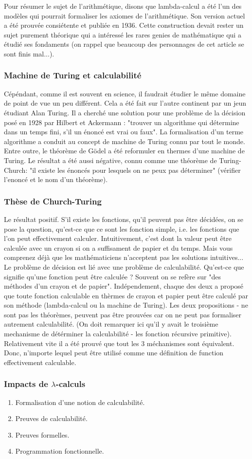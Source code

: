 \documentclass[12pt, a4paper]{article}
\begin{document}
Pour résumer le sujet de l'arithmétique, disons que lambda-calcul a été l'un des modèles qui pourrait formaliser les axiomes de l'arithmétique. Son version actuel a été prouvée consiétente et publiée en 1936. Cette construction devait rester un sujet purement théorique qui a intéressé les rares genies de mathématique qui a étudié ses fondaments (on rappel que beaucoup des personnages de cet article se sont finis mal...). 

\subsubsection*{Machine de Turing et calculabilité}
Cépéndant, comme il est souvent en science, il faudrait étudier le même domaine de point de vue un peu différent. Cela a été fait sur l'autre continent par un jeun étudiant Alan Turing. Il a cherché une solution pour une problème de la décision posé en 1928 par Hilbert et Ackermann : "trouver un algorithme qui détermine dans un temps fini, s'il un énoncé est vrai ou faux". La formalisation d'un terme algorithme a conduit au concept de machine de Turing connu par tout le monde. Entre outre, le théorème de Gödel a été reformuler en thermes d'une machine de Turing.
Le résultat a été aussi négative, connu comme une théorème de Turing-Church: "il existe les énoncés pour lesquels on ne peux pas déterminer" (vérifier l'enoncé et le nom d'un théorème).

\subsubsection*{Thèse de Church-Turing}
Le résultat positif.
S'il existe les fonctions, qu'il peuvent pas être décidées, on se pose la question, qu'est-ce que ce sont les fonction simple, i.e. les fonctions que l'on peut effectivement calculer.
Intuitivement, c'est dont la valeur peut être calculée avec un crayon si on a suffisament de papier et du temps.
Mais vous comprenez déjà que les mathématiciens n'acceptent pas les solutions intuitives...
Le problème de décision est lié avec une problème de calculabilité. Qu'est-ce que signifie qu'une fonction peut être calculée ? Souvent on se refère sur "des méthodes d'un crayon et de papier". Indépendement, chaque des deux a proposé que toute fonction calculable en thèrmes de crayon et papier peut être calculé par son méthode (lambda-calcul ou la machine de Turing). Les deux propositions - ne sont pas les théorèmes, peuvent pas être prouvées car on ne peut pas formaliser autrement calculabilité. (On doit remarquer ici qu'il y avait le troisième mechanisme de détérminer la calculabilité - les fonction récursive primitive). Relativement vite il a été prouvé que tout les 3 méchanismes sont équivalent. Donc, n'importe lequel peut être utilisé comme une définition de function effectivement calculable.

\subsubsection*{Impacts de $\lambda$-calculs}
\begin{enumerate}
	\item Formalisation d'une notion de calculabilité.
	\item Preuves de calculabilité.
	\item Preuves formelles.
	\item Programmation fonctionnelle.
\end{enumerate}
\end{document}

